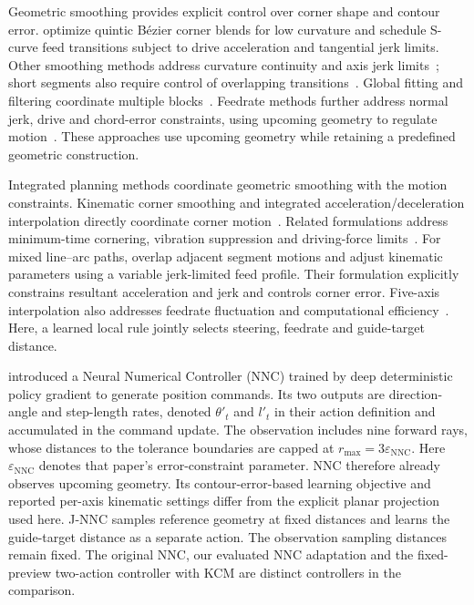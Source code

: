 \documentclass[pdflatex,sn-apa]{sn-jnl}
\begin{document}
Geometric smoothing provides explicit control over corner shape and contour error. \citet{Sencer2014} optimize quintic B\'ezier corner blends for low curvature and schedule S-curve feed transitions subject to drive acceleration and tangential jerk limits. Other smoothing methods address curvature continuity and axis jerk limits~\citep{Fan2015,Zhang2018}; short segments also require control of overlapping transitions~\citep{Hu2024,Yan2023}. Global fitting and filtering coordinate multiple blocks~\citep{Song2021,Yang2015}. Feedrate methods further address normal jerk, drive and chord-error constraints, using upcoming geometry to regulate motion~\citep{Zhang2021,Wu2022,Tsai2010,Song2020,Zhao2013}. These approaches use upcoming geometry while retaining a predefined geometric construction.

Integrated planning methods coordinate geometric smoothing with the motion constraints. Kinematic corner smoothing and integrated acceleration/deceleration interpolation directly coordinate corner motion~\citep{Tajima2016,Tsai2016}. Related formulations address minimum-time cornering, vibration suppression and driving-force limits~\citep{Duan2016,Sencer2015,LiDriving2017}. For mixed line--arc paths, \citet{Li2023} overlap adjacent segment motions and adjust kinematic parameters using a variable jerk-limited feed profile. Their formulation explicitly constrains resultant acceleration and jerk and controls corner error. Five-axis interpolation also addresses feedrate fluctuation and computational efficiency~\citep{Sun2024}. Here, a learned local rule jointly selects steering, feedrate and guide-target distance.

\citet{Li2020} introduced a Neural Numerical Controller (NNC) trained by deep deterministic policy gradient to generate position commands. Its two outputs are direction-angle and step-length rates, denoted $\theta'_t$ and $l'_t$ in their action definition and accumulated in the command update. The observation includes nine forward rays, whose distances to the tolerance boundaries are capped at $r_{\max}=3\varepsilon_{\mathrm{NNC}}$. Here $\varepsilon_{\mathrm{NNC}}$ denotes that paper's error-constraint parameter. NNC therefore already observes upcoming geometry. Its contour-error-based learning objective and reported per-axis kinematic settings differ from the explicit planar projection used here. J-NNC samples reference geometry at fixed distances and learns the guide-target distance as a separate action. The observation sampling distances remain fixed. The original NNC, our evaluated NNC adaptation and the fixed-preview two-action controller with KCM are distinct controllers in the comparison.
\end{document}
